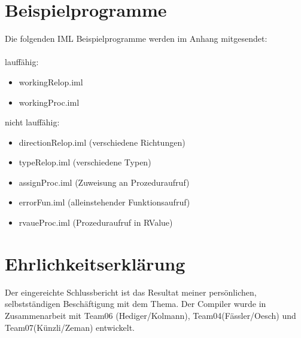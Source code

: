 \documentclass[a4paper,10pt]{article}
\begin{document}
\section{Beispielprogramme}
Die folgenden IML Beispielprogramme werden im Anhang mitgesendet:\\\\
lauff\"ahig:
\begin{itemize}
\item workingRelop.iml
\item workingProc.iml
\end{itemize}
nicht lauff\"ahig:
\begin{itemize}
\item directionRelop.iml (verschiedene Richtungen)
\item typeRelop.iml (verschiedene Typen)
\item assignProc.iml (Zuweisung an Prozeduraufruf)
\item errorFun.iml (alleinstehender Funktionsaufruf)
\item rvaueProc.iml  (Prozeduraufruf in RValue)
\end{itemize}
\section{Ehrlichkeitserkl\"arung}
Der eingereichte Schlussbericht ist das Resultat meiner pers\"onlichen, selbstst\"andigen Besch\"aftigung mit dem Thema. Der Compiler wurde in Zusammenarbeit mit Team06 (Hediger/Kolmann), Team04(F\"assler/Oesch) und Team07(K\"unzli/Zeman) entwickelt.
\end{document}
